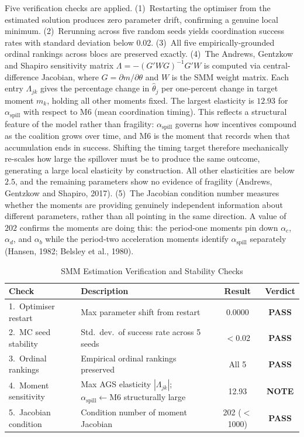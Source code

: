 \documentclass[10pt,a4paper]{article}
\begin{document}
Five verification checks are applied. (1)~Restarting the optimiser from the estimated solution produces zero parameter drift, confirming a genuine local minimum. (2)~Rerunning across five random seeds yields coordination success rates with standard deviation below 0.02. (3)~All five empirically-grounded ordinal rankings across blocs are preserved exactly. (4)~The Andrews, Gentzkow and Shapiro sensitivity matrix $\Lambda = -(G'WG)^{-1}G'W$ is computed via central-difference Jacobian, where $G = \partial m / \partial \theta$ and $W$ is the SMM weight matrix. Each entry $\Lambda_{jk}$ gives the percentage change in $\hat{\theta}_j$ per one-percent change in target moment $m_k$, holding all other moments fixed. The largest elasticity is $12.93$ for $\alpha_{\text{spill}}$ with respect to M6 (mean coordination timing). This reflects a structural feature of the model rather than fragility: $\alpha_{\text{spill}}$ governs how incentives compound as the coalition grows over time, and M6 is the moment that records when that accumulation ends in success. Shifting the timing target therefore mechanically re-scales how large the spillover must be to produce the same outcome, generating a large local elasticity by construction. All other elasticities are below $2.5$, and the remaining parameters show no evidence of fragility (Andrews, Gentzkow and Shapiro, 2017). (5)~The Jacobian condition number measures whether the moments are providing genuinely independent information about different parameters, rather than all pointing in the same direction. A value of $202$ confirms the moments are doing this: the period-one moments pin down $\alpha_c$, $\alpha_d$, and $\alpha_b$ while the period-two acceleration moments identify $\alpha_{\text{spill}}$ separately (Hansen, 1982; Belsley et al., 1980).

\begin{table}[htbp]
\centering
\small
\caption{SMM Estimation Verification and Stability Checks}
\label{tab:smm_verification}
\begin{tabular}{llcc}
\toprule
\textbf{Check} & \textbf{Description} & \textbf{Result} & \textbf{Verdict} \\
\midrule
1.\ Optimiser restart   & Max parameter shift from restart               & 0.0000        & \textbf{PASS} \\
2.\ MC seed stability   & Std.\ dev.\ of success rate across 5 seeds     & $<$0.02       & \textbf{PASS} \\
3.\ Ordinal rankings    & Empirical ordinal rankings preserved           & All 5         & \textbf{PASS} \\
4.\ Moment sensitivity  & Max AGS elasticity $|\Lambda_{jk}|$; $\alpha_{\text{spill}} \leftarrow \text{M6}$ structurally large & 12.93 & \textbf{NOTE} \\
5.\ Jacobian condition  & Condition number of moment Jacobian            & 202 ($<$1000) & \textbf{PASS} \\
\bottomrule
\end{tabular}
\end{table}
\end{document}
